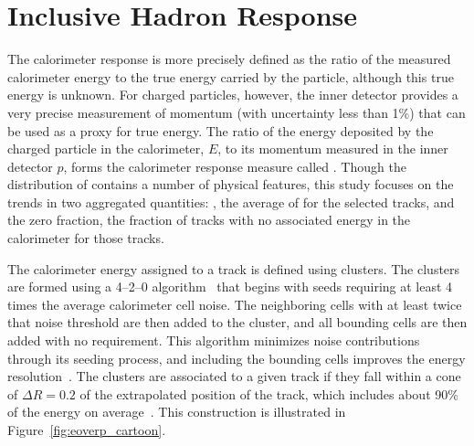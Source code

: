 \section{Inclusive Hadron Response}
\label{sec:inclusive}

The calorimeter response is more precisely defined as the ratio of the measured calorimeter energy to the true energy carried by the particle, although this true energy is unknown. 
For charged particles, however, the inner detector provides a very precise measurement of momentum (with uncertainty less than 1\%) that can be used as a proxy for true energy.
The ratio of the energy deposited by the charged particle in the calorimeter, $E$, to its momentum measured in the inner detector $p$, forms the calorimeter response measure called \ep.
Though the distribution of \ep contains a number of physical features, this study focuses on the trends in two aggregated quantities: \epav, the average of \ep for the selected tracks, and the zero fraction, the fraction of tracks with no associated energy in the calorimeter for those tracks.

The calorimeter energy assigned to a track is defined using clusters. 
The clusters are formed using a 4--2--0 algorithm~\cite{TopoClusters} that begins with seeds requiring at least 4 times the average calorimeter cell noise. 
The neighboring cells with at least twice that noise threshold are then added to the cluster, and all bounding cells are then added with no requirement. 
This algorithm minimizes noise contributions through its seeding process, and including the bounding cells improves the energy resolution~\cite{Speckmayer}.
The clusters are associated to a given track if they fall within a cone of $\Delta R = 0.2$ of the extrapolated position of the track, which includes about 90\% of the energy on average~\cite{PERF-2011-05}.
This construction is illustrated in Figure~\ref{fig:eoverp_cartoon}.

